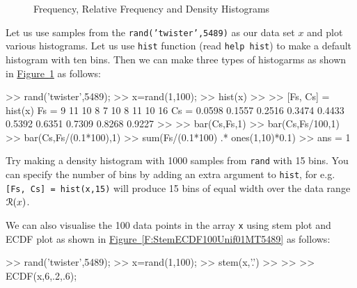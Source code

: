 \begin{figure}[htpb]
\caption{Frequency, Relative Frequency and Density Histograms\label{F:FreqRelFreqDensityHistograms100Unif01MT5489}}
\centering   {}
\end{figure}

\begin{labwork}\label{LW:hist}
Let us use samples from the {\tt rand('twister',5489)} as our data set $x$ and plot various histograms.  Let us use {\tt hist} function (read {\tt help hist}) to make a default histogram with ten bins.  Then we can make three types of histogarms as shown in \hyperref[F:FreqRelFreqDensityHistograms100Unif01MT5489]{Figure~\ref*{F:FreqRelFreqDensityHistograms100Unif01MT5489}}  as follows:
\begin{VrbM}
>> rand('twister',5489);
>> x=rand(1,100); %
>> hist(x) %
>> %
>> [Fs, Cs] = hist(x) %
Fs =
     9    11    10     8     7    10     8    11    10    16
Cs =
    0.0598    0.1557    0.2516    0.3474    0.4433    0.5392    0.6351    0.7309    0.8268    0.9227
>> %
>> bar(Cs,Fs,1) %
>> bar(Cs,Fs/100,1) %
>> bar(Cs,Fs/(0.1*100),1) %
>> sum(Fs/(0.1*100) .* ones(1,10)*0.1) %
>> ans = 1
\end{VrbM}
Try making a density histogram with 1000 samples from {\tt rand} with 15 bins.  You can specify the number of bins by adding an extra argument to {\tt hist}, for e.g. {\tt [Fs, Cs] = hist(x,15)} will produce 15 bins of equal width over the data range $\mathcal{R}(x)$.
\end{labwork}

\begin{labwork}\label{LW:StemEcdf}
We can also visualise the 100 data points in the array {\tt x} using stem plot and ECDF plot as shown in \hyperref[F:StemECDF100Unif01MT5489]{Figure~\ref*{F:StemECDF100Unif01MT5489}} as follows:
\begin{VrbM}
>> rand('twister',5489);
>> x=rand(1,100); %
>> stem(x,'.') %
>>%
>>%
>> ECDF(x,6,.2,.6);
\end{VrbM}
\end{labwork}

